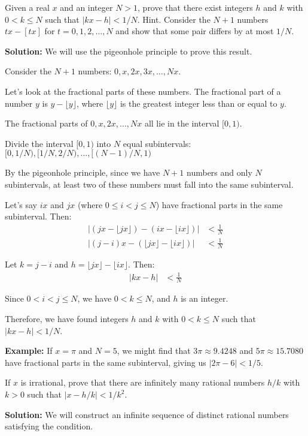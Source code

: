 \begin{problembox}
Given a real $x$ and an integer $N > 1$, prove that there exist integers $h$ and $k$ with $0 < k \leq N$ such that $|kx - h| < 1/N$. Hint. Consider the $N+1$ numbers $tx-[tx]$ for $t=0,1,2,\dots,N$ and show that some pair differs by at most $1/N$.
\end{problembox}

\textbf{Solution:}
We will use the pigeonhole principle to prove this result.

Consider the $N + 1$ numbers: $0, x, 2x, 3x, \ldots, Nx$.

Let's look at the fractional parts of these numbers. The fractional part of a number $y$ is $y - \lfloor y \rfloor$, where $\lfloor y \rfloor$ is the greatest integer less than or equal to $y$.

The fractional parts of $0, x, 2x, \ldots, Nx$ all lie in the interval $[0, 1)$.

Divide the interval $[0, 1)$ into $N$ equal subintervals:
$[0, 1/N), [1/N, 2/N), \ldots, [(N-1)/N, 1)$

By the pigeonhole principle, since we have $N + 1$ numbers and only $N$ subintervals, at least two of these numbers must fall into the same subinterval.

Let's say $ix$ and $jx$ (where $0 \leq i < j \leq N$) have fractional parts in the same subinterval. Then:
\begin{align*}
|(jx - \lfloor jx \rfloor) - (ix - \lfloor ix \rfloor)| &< \frac{1}{N} \\
|(j - i)x - (\lfloor jx \rfloor - \lfloor ix \rfloor)| &< \frac{1}{N}
\end{align*}

Let $k = j - i$ and $h = \lfloor jx \rfloor - \lfloor ix \rfloor$. Then:
\begin{align*}
|kx - h| &< \frac{1}{N}
\end{align*}

Since $0 < i < j \leq N$, we have $0 < k \leq N$, and $h$ is an integer.

Therefore, we have found integers $h$ and $k$ with $0 < k \leq N$ such that $|kx - h| < 1/N$.

\textbf{Example:}
If $x = \pi$ and $N = 5$, we might find that $3\pi \approx 9.4248$ and $5\pi \approx 15.7080$ have fractional parts in the same subinterval, giving us $|2\pi - 6| < 1/5$.

\begin{problembox}
If $x$ is irrational, prove that there are infinitely many rational numbers $h/k$ with $k > 0$ such that $|x - h/k| < 1/k^2$.
\end{problembox}
\textbf{Solution:}
We will construct an infinite sequence of distinct rational numbers satisfying the condition.

